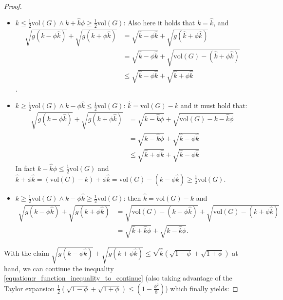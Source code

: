 \documentclass[../main.tex]{subfiles}
\begin{document}
\begin{proof}
\begin{itemize}
        \item $k\leq\frac{1}{2}\text{vol}(G) \land k + \hat{k}\phi \geq \frac{1}{2}\text{vol}(G)$: Also here it holds that $k = \hat{k}$, and 
        \begin{align} 
            \sqrt{g(k - \phi\hat{k})} + \sqrt{g(k+\phi\hat{k})} & = \sqrt{\hat{k} - \phi\hat{k}} + \sqrt{g(\hat{k} + \phi\hat{k})} \\ 
            & = \sqrt{\hat{k} - \phi\hat{k}} + \sqrt{\text{vol}(G) - (\hat{k} + \phi\hat{k})} \\
            & \leq \sqrt{\hat{k} - \phi\hat{k}} + \sqrt{\hat{k} + \phi\hat{k}}
        \end{align}.
        
        \item $k \geq \frac{1}{2}\text{vol}(G) \land k - \phi\hat{k} \leq \frac{1}{2}\text{vol}(G)$: $\hat{k} = \text{vol}(G) - k$ and it must hold that:
        \begin{align}
            \sqrt{g(k - \phi\hat{k})} + \sqrt{g(k+\phi\hat{k})} & = 
            \sqrt{k - \hat{k}\phi} + \sqrt{\text{vol}(G) - k - \hat{k}\phi} \\
            & = \sqrt{k - \hat{k}\phi} + \sqrt{\hat{k} - \phi\hat{k}} \\
            & \leq \sqrt{\hat{k} + \phi\hat{k}} + \sqrt{\hat{k} - \phi\hat{k}}
        \end{align}
        In fact $k - \hat{k}\phi \leq \frac{1}{2}\text{vol}(G)$ and $\hat{k} + \phi\hat{k} = (\text{vol}(G) - k) + \phi\hat{k} = \text{vol}(G) - (k - \phi\hat{k}) \geq \frac{1}{2}\text{vol}(G)$.
        
        \item $k \geq \frac{1}{2}\text{vol}(G) \land k - \phi\hat{k} \geq \frac{1}{2}\text{vol}(G)$: then $\hat{k} = \text{vol}(G) - k$ and
        \begin{align}
            \sqrt{g(k - \phi\hat{k})} + \sqrt{g(k+\phi\hat{k})} & =
            \sqrt{\text{vol}(G) - (k - \phi\hat{k})} + \sqrt{\text{vol}(G) - (k + \phi\hat{k})} \\ 
            & = \sqrt{\hat{k} + \hat{k}\phi} + \sqrt{\hat{k} - \hat{k}\phi}.
        \end{align}
    \end{itemize}
    With the claim $\sqrt{g(k - \phi\hat{k})} + \sqrt{g(k + \phi\hat{k})} \leq \sqrt{\hat{k}}(\sqrt{1 - \phi} + \sqrt{1+\phi})$ at hand, we can continue the inequality  \ref{equation:r_function_inequality_to_continue} (also taking advantage of the Taylor expansion $\frac{1}{2}(\sqrt{1-\phi} + \sqrt{1+\phi}) \leq \left(1-\frac{\phi^2}{8}\right)$) which finally yields: 
    

\end{proof}
\end{document}
